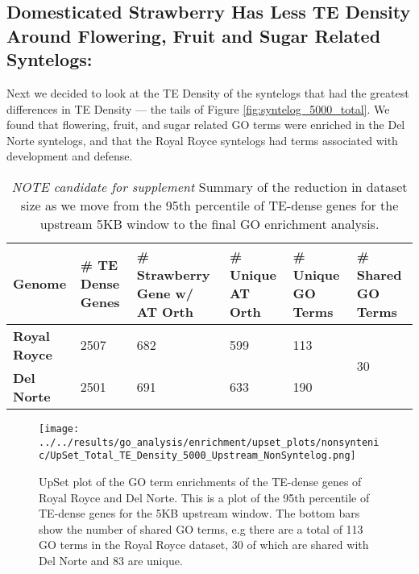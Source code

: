 \documentclass[fleqn,10pt]{olplainarticle}
\begin{document}

\subsection{Domesticated Strawberry Has Less TE Density Around Flowering, Fruit and Sugar Related Syntelogs:}
Next we decided to look at the TE Density of the syntelogs that had the greatest differences in TE Density --- the tails of Figure \ref{fig:syntelog_5000_total}.
We found that flowering, fruit, and sugar related GO terms were enriched in the Del Norte syntelogs, and that the Royal Royce syntelogs had terms associated with development and defense.


\begin{table}[]
\centering
\small
\begin{tabular}{l|l|l|l|l|l}
\toprule
\textbf{Genome} & \textbf{\# TE Dense Genes} & \textbf{\# Strawberry Gene w/ AT Orth} & \textbf{\# Unique AT Orth} & \textbf{\# Unique GO Terms} & \textbf{\# Shared GO Terms} \\
\bottomrule
\textbf{Royal Royce}     & 2507                        & 682                                        & 599                      & 113                   & \multirow{2}{*}{30}          \\
\textbf{Del Norte}       & 2501                        & 691                                        & 633                      & 190                   &                              \\
\bottomrule
\end{tabular}
\caption{\textit{NOTE candidate for supplement} Summary of the reduction in dataset size as we move from the 95th percentile of TE-dense genes for the upstream 5KB window to the final GO enrichment analysis.}
\label{tab:upset_numbers}
\end{table}

\begin{figure}[ht]
\centering
\texttt{[image: ../../results/go\_analysis/enrichment/upset\_plots/nonsyntenic/UpSet\_Total\_TE\_Density\_5000\_Upstream\_NonSyntelog.png]}
	\caption{UpSet plot of the GO term enrichments of the TE-dense genes of Royal Royce and Del Norte. This is a plot of the 95th percentile of TE-dense genes for the 5KB upstream window. The bottom bars show the number of shared GO terms, e.g there are a total of 113 GO terms in the Royal Royce dataset, 30 of which are shared with Del Norte and 83 are unique.}
	\label{fig:go_compare_total_5K}
\end{figure}
\end{document}
